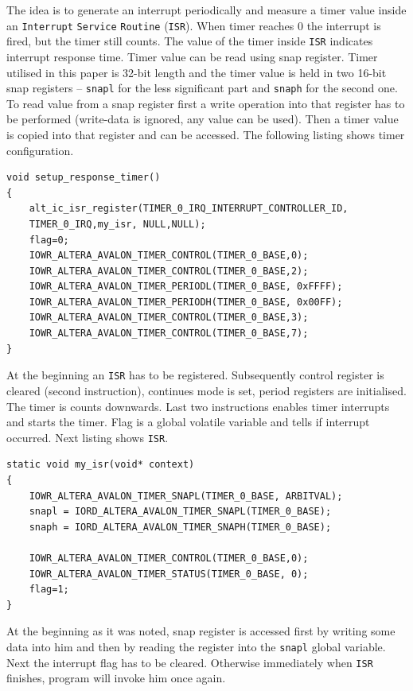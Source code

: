 The idea is to generate an interrupt periodically and measure a timer value inside an \verb|Interrupt| \verb|Service| \verb|Routine| (\verb|ISR|). When timer reaches 0 the interrupt is fired, but the timer still counts. The value of the timer inside \verb|ISR| indicates interrupt response time. Timer value can be read using snap register. Timer utilised in this paper is 32-bit length and the timer value is held in two 16-bit snap registers -- \verb|snapl| for the less significant part and \verb|snaph| for the second one. To read value from a snap register first a write operation into that register has to be performed (write-data is ignored, any value can be used). Then a timer value is copied into that register and can be accessed. The following listing shows timer configuration. 
\begin{lstlisting}[style=customc, frame=none]
void setup_response_timer()
{
    alt_ic_isr_register(TIMER_0_IRQ_INTERRUPT_CONTROLLER_ID,
    TIMER_0_IRQ,my_isr, NULL,NULL);
    flag=0;
    IOWR_ALTERA_AVALON_TIMER_CONTROL(TIMER_0_BASE,0);
    IOWR_ALTERA_AVALON_TIMER_CONTROL(TIMER_0_BASE,2);
    IOWR_ALTERA_AVALON_TIMER_PERIODL(TIMER_0_BASE, 0xFFFF); 
    IOWR_ALTERA_AVALON_TIMER_PERIODH(TIMER_0_BASE, 0x00FF);
    IOWR_ALTERA_AVALON_TIMER_CONTROL(TIMER_0_BASE,3);
    IOWR_ALTERA_AVALON_TIMER_CONTROL(TIMER_0_BASE,7);
}
\end{lstlisting}
At the beginning an \verb|ISR| has to be registered. Subsequently control register is cleared (second instruction), continues mode is set, period registers are initialised. The timer is counts downwards. Last two instructions enables timer interrupts and starts the timer. Flag is a global volatile variable and tells if interrupt occurred. Next listing shows \verb|ISR|.
\begin{lstlisting}[style=customc, frame=none]
static void my_isr(void* context)
{
    IOWR_ALTERA_AVALON_TIMER_SNAPL(TIMER_0_BASE, ARBITVAL);
    snapl = IORD_ALTERA_AVALON_TIMER_SNAPL(TIMER_0_BASE);
    snaph = IORD_ALTERA_AVALON_TIMER_SNAPH(TIMER_0_BASE);
    
    IOWR_ALTERA_AVALON_TIMER_CONTROL(TIMER_0_BASE,0);
    IOWR_ALTERA_AVALON_TIMER_STATUS(TIMER_0_BASE, 0);
    flag=1;
}
\end{lstlisting}
At the beginning as it was noted, snap register is accessed first by writing some data into him and then by reading the register into the \verb|snapl| global variable. Next the interrupt flag has to be cleared. Otherwise immediately when \verb|ISR| finishes, program will invoke him once again. 
